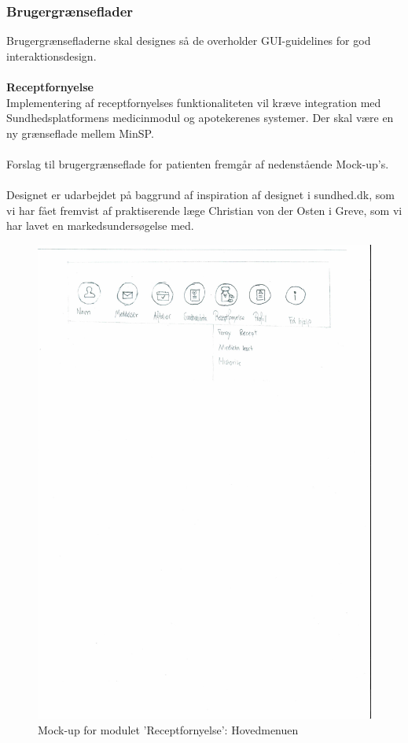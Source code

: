 \subsubsection{Brugergrænseflader} %
Brugergrænsefladerne skal designes så de overholder GUI-guidelines for god interaktionsdesign. %
\\\\
\textbf{Receptfornyelse} \\
Implementering af receptfornyelses funktionaliteten vil kræve integration med Sundhedsplatformens medicinmodul og apotekerenes systemer. 
Der skal være en ny grænseflade mellem MinSP. \\\\
Forslag til brugergrænseflade for patienten fremgår af nedenstående Mock-up's. \\
\\
Designet er udarbejdet på baggrund af inspiration af designet i sundhed.dk, som vi har fået fremvist af praktiserende læge Christian von der Osten i Greve, som vi har lavet en markedsundersøgelse med.\\
\begin{figure}[H]
	\centering
	\includegraphics[angle=0, width=\linewidth]{Materials/FornyRecept_Hovedmenu.pdf}
	\caption{Mock-up for modulet 'Receptfornyelse': Hovedmenuen}
	\label{fig:Mock-Up1}
\end{figure}
